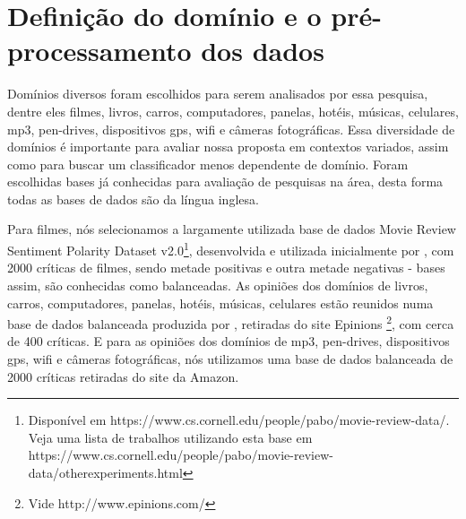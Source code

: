 
\section{Definição do domínio e o pré-processamento dos dados}

 Domínios diversos foram escolhidos para serem analisados por essa pesquisa, dentre eles filmes, livros, carros, computadores, panelas, hotéis, músicas, celulares, mp3, pen-drives, dispositivos gps, wifi e câmeras fotográficas. Essa diversidade de domínios é importante para avaliar nossa proposta em contextos variados, assim como para buscar um classificador menos dependente de domínio. Foram escolhidas bases já conhecidas para avaliação de pesquisas na área, desta forma todas as bases de dados são da língua inglesa.

Para filmes, nós selecionamos a largamente utilizada base de dados Movie Review Sentiment Polarity Dataset v2.0\footnote{Disponível em https://www.cs.cornell.edu/people/pabo/movie-review-data/. Veja uma lista de trabalhos utilizando esta base em https://www.cs.cornell.edu/people/pabo/movie-review-data/otherexperiments.html}, desenvolvida e utilizada inicialmente por \cite{pang2004sentimental}, com 2000 críticas de filmes, sendo metade positivas e outra metade negativas - bases assim, são conhecidas como balanceadas. As opiniões dos domínios de livros, carros, computadores, panelas, hotéis, músicas, celulares estão reunidos numa base de dados   balanceada produzida por \cite{taboada2011lexicon}, retiradas do site Epinions \footnote{Vide http://www.epinions.com/}, com cerca de 400 críticas. E para as opiniões dos domínios de mp3, pen-drives, dispositivos gps, wifi e câmeras fotográficas, nós utilizamos uma base de dados  balanceada de 2000 críticas retiradas do site da Amazon. 


